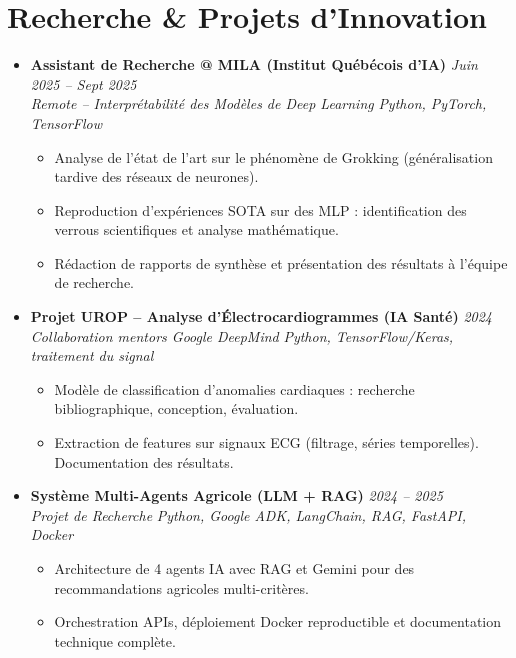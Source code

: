 \documentclass[a4paper,11pt]{article}
\begin{document}
\section{Recherche \& Projets d'Innovation}
\begin{itemize}[leftmargin=*, label={-}]

\item \textbf{Assistant de Recherche @ MILA (Institut Québécois d'IA)} \hfill \textit{Juin 2025 -- Sept 2025} \\
\textit{Remote -- Interprétabilité des Modèles de Deep Learning} \hfill \textit{Python, PyTorch, TensorFlow}
\vspace{-2pt}
    \begin{itemize}[leftmargin=0.4cm, nosep, label=\tiny$\bullet$]
        \item \small{Analyse de l'état de l'art sur le phénomène de Grokking (généralisation tardive des réseaux de neurones).}
        \item \small{Reproduction d'expériences SOTA sur des MLP : identification des verrous scientifiques et analyse mathématique.}
        \item \small{Rédaction de rapports de synthèse et présentation des résultats à l'équipe de recherche.}
    \end{itemize}
\vspace{3pt}

\item \textbf{Projet UROP -- Analyse d'Électrocardiogrammes (IA Santé)} \hfill \textit{2024} \\
\textit{Collaboration mentors Google DeepMind} \hfill \textit{Python, TensorFlow/Keras, traitement du signal}
\vspace{-2pt}
    \begin{itemize}[leftmargin=0.4cm, nosep, label=\tiny$\bullet$]
        \item \small{Modèle de classification d'anomalies cardiaques : recherche bibliographique, conception, évaluation.}
        \item \small{Extraction de features sur signaux ECG (filtrage, séries temporelles). Documentation des résultats.}
    \end{itemize}
\vspace{3pt}

\item \textbf{Système Multi-Agents Agricole (LLM + RAG)} \hfill \textit{2024 -- 2025} \\
\textit{Projet de Recherche} \hfill \textit{Python, Google ADK, LangChain, RAG, FastAPI, Docker}
\vspace{-2pt}
    \begin{itemize}[leftmargin=0.4cm, nosep, label=\tiny$\bullet$]
        \item \small{Architecture de 4 agents IA avec RAG et Gemini pour des recommandations agricoles multi-critères.}
        \item \small{Orchestration APIs, déploiement Docker reproductible et documentation technique complète.}
    \end{itemize}
\vspace{3pt}


\end{itemize}
\end{document}
